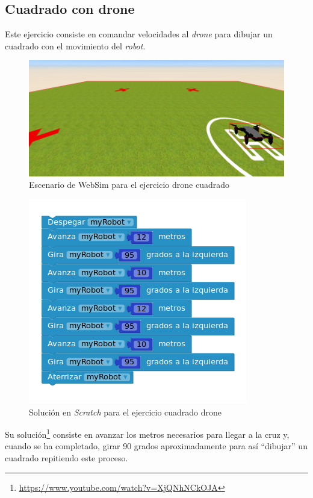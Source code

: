 \subsection{Cuadrado con drone}
Este ejercicio consiste en comandar velocidades al \textit{drone} para dibujar un cuadrado con el movimiento del \textit{robot}.

    \begin{figure}[H]
        \centering
        \includegraphics[scale=0.4]{img/cuadradoDrone.png}
        \caption{Escenario de WebSim para el ejercicio drone cuadrado} 
        \label{fig:droneCuadrado}
    \end{figure}

    \begin{figure}[H]
    \centering
    \includegraphics[scale=0.4]{img/tellocuadradocodigo.png}
    \caption{Solución en \textit{Scratch} para el ejercicio cuadrado drone} 
    \label{fig:cuadradoSolution}
    \end{figure}
    Su solución\footnote{\url{https://www.youtube.com/watch?v=XjQNhNCkOJA}} consiste en avanzar los metros necesarios para llegar a la cruz y, cuando se ha completado, girar 90 grados aproximadamente para así ``dibujar'' un cuadrado repitiendo este proceso.
    
